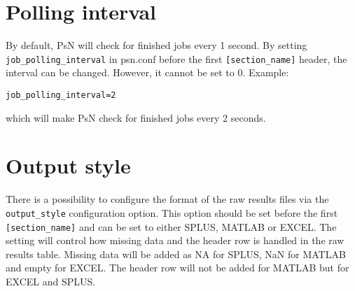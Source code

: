 \section{Polling interval}
By default, PsN will check for finished jobs every 1 second.
By setting \verb|job_polling_interval| in psn.conf before the first \verb|[section_name]| header, the interval can be changed.
However, it cannot be set to 0.
Example:
\begin{verbatim}
job_polling_interval=2
\end{verbatim}
which will make PsN check for finished jobs every 2 seconds.

\section{Output style}
There is a possibility to configure the format of the raw results files via the \verb|output_style| configuration option. This option should
be set before the first \verb|[section_name]| and can be set to either SPLUS, MATLAB or EXCEL. The setting will control how missing data and the header row is handled in the raw results table. Missing data will be added as NA for SPLUS, NaN for MATLAB and empty for EXCEL. The header row will not be added for MATLAB but for EXCEL and SPLUS.



